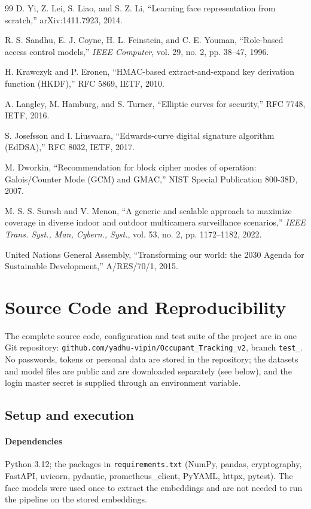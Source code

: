 \documentclass[12pt,a4paper,oneside]{report}
\begin{document}
\begin{thebibliography}{99}
D. Yi, Z. Lei, S. Liao, and S. Z. Li,
``Learning face representation from scratch,''
arXiv:1411.7923, 2014.

R. S. Sandhu, E. J. Coyne, H. L. Feinstein, and C. E. Youman,
``Role-based access control models,''
\textit{IEEE Computer},
vol. 29, no. 2, pp. 38--47,
1996.

H. Krawczyk and P. Eronen,
``HMAC-based extract-and-expand key derivation function (HKDF),''
RFC 5869, IETF, 2010.

A. Langley, M. Hamburg, and S. Turner,
``Elliptic curves for security,''
RFC 7748, IETF, 2016.

S. Josefsson and I. Liusvaara,
``Edwards-curve digital signature algorithm (EdDSA),''
RFC 8032, IETF, 2017.

M. Dworkin,
``Recommendation for block cipher modes of operation: Galois/Counter Mode (GCM) and GMAC,''
NIST Special Publication 800-38D, 2007.

M. S. S. Suresh and V. Menon,
``A generic and scalable approach to maximize coverage in diverse indoor and outdoor multicamera surveillance scenarios,''
\textit{IEEE Trans. Syst., Man, Cybern., Syst.},
vol. 53, no. 2, pp. 1172--1182,
2022.

United Nations General Assembly,
``Transforming our world: the 2030 Agenda for Sustainable Development,''
A/RES/70/1, 2015.

\end{thebibliography}
\clearpage
\appendix\chapter{Source Code and Reproducibility}
The complete source code, configuration and test suite of the project are in one Git repository: \texttt{github.com/yadhu-vipin/Occupant\_\allowbreak Tracking\_\allowbreak v2}, branch \texttt{test\_}. No passwords, tokens or personal data are stored in the repository; the datasets and model files are public and are downloaded separately (see below), and the login master secret is supplied through an environment variable.

\section{Setup and execution}\label{app:setup}
\subsubsection{Dependencies}
Python 3.12; the packages in \texttt{requirements.txt} (NumPy, pandas, cryptography, FastAPI, uvicorn, pydantic, prometheus\_\allowbreak client, PyYAML, httpx, pytest). The face models were used once to extract the embeddings and are not needed to run the pipeline on the stored embeddings.
\end{document}
